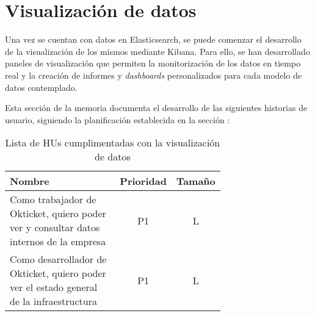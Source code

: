 \section{Visualización de datos}\label{sec:impl_visualizacion}
Una vez se cuentan con datos en Elasticsearch, se puede comenzar el desarrollo
de la visualización de los mismos mediante Kibana. Para ello, se han desarrollado
paneles de visualización que permiten la monitorización de los datos en tiempo
real y la creación de informes y \textit{dashboards} personalizados para cada
modelo de datos contemplado.

Esta sección de la memoria documenta el desarrollo de las siguientes historias
de usuario, siguiendo la planificación establecida en la sección :

\begin{table}[H]
	\centering
	\begin{tabular}{|p{0.7\linewidth}|c|c|}
		\hline
		\textbf{Nombre} & \textbf{Prioridad} & \textbf{Tamaño} \\
		\hline
		\hline
		Como trabajador de Okticket, quiero poder ver y consultar datos internos de la empresa & P1\cellcolor{orange!50} & L\cellcolor{orange!50} \\
		\hline
		Como desarrollador de Okticket, quiero poder ver el estado general de la infraestructura & P1\cellcolor{orange!50} & L\cellcolor{orange!50} \\
		\hline
  \end{tabular}
  \caption{Lista de HUs cumplimentadas con la visualización de datos}
  \label{tab:impl_visualizacion}
\end{table}
